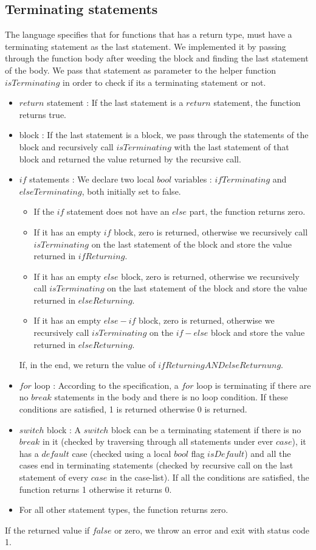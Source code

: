 \documentclass[a4paper]{article}
\begin{document}
\subsection{Terminating statements}
The language specifies that for functions that has a return type, must have a terminating statement as the last statement. We implemented it by passing through the function body after weeding the block and finding the last statement of the body. We pass that statement as parameter to the helper function $isTerminating$ in order to check if its a terminating statement or not.
\begin{itemize}
\item $return$ statement : If the last statement is a $return$ statement, the function returns true. 
\item block : If the last statement is a block, we pass through the statements of the block and recursively call $isTerminating$ with the last statement of that block and returned the value returned by the recursive call.
\item $if$ statements : We declare two local $bool$ variables : $ifTerminating$ and $elseTerminating$, both initially set to false. 
\begin{itemize}
\item If the $if$ statement does not have an $else$ part, the function returns zero. 
\item If it has an empty $if$ block, zero is returned, otherwise we recursively call $isTerminating$ on the last statement of the block and store the value returned in $ifReturning$.
\item If it has an empty $else$ block, zero is returned, otherwise we recursively call $isTerminating$ on the last statement of the block and store the value returned in $elseReturning$.
\item If it has an empty $else-if$ block, zero is returned, otherwise we recursively call $isTerminating$ on the $if-else$ block and store the value returned in $elseReturning$.
\end{itemize} 
If, in the end, we return the value of $ifReturning AND elseReturnung$.
\item $for$ loop : According to the specification, a $for$ loop is terminating if there are no $break$ statements in the body and there is no loop condition. If these conditions are satisfied, 1 is returned otherwise 0 is returned.
\item $switch$ block : A $switch$ block can be a terminating statement if there is no $break$ in it (checked by traversing through all statements under ever $case$), it has a $default$ case (checked using a local $bool$ flag $isDefault$) and all the cases end in terminating statements (checked by recursive call on the last statement of every $case$ in the case-list). If all the conditions are satisfied, the function returns 1 otherwise it returns 0. 
\item For all other statement types, the function returns zero.
\end{itemize}
If the returned value if $false$ or zero, we throw an error and exit with status code 1.
\end{document}

